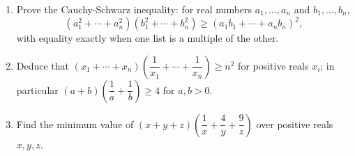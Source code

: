 \begin{enumerate}
\item[(a)] Prove the Cauchy-Schwarz inequality: for real numbers $a_1,\dots,a_n$ and $b_1,\dots,b_n$,
\[
\left(a_1^2+\cdots+a_n^2\right)\left(b_1^2+\cdots+b_n^2\right)\ge\left(a_1b_1+\cdots+a_nb_n\right)^2,
\]
with equality exactly when one list is a multiple of the other.
\item[(b)] Deduce that $(x_1+\cdots+x_n)\left(\dfrac{1}{x_1}+\cdots+\dfrac{1}{x_n}\right)\ge n^2$ for positive reals $x_i$; in particular $(a+b)\left(\dfrac{1}{a}+\dfrac{1}{b}\right)\ge4$ for $a,b>0$.
\item[(c)] Find the minimum value of $(x+y+z)\left(\dfrac{1}{x}+\dfrac{4}{y}+\dfrac{9}{z}\right)$ over positive reals $x,y,z$.
\end{enumerate}
